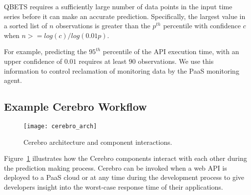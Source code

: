 
QBETS requires a sufficiently large number of data points
in the input time series before it can make an accurate prediction. 
Specifically, the largest value in a sorted list of $n$ observations is
greater than the $p^{th}$ percentile with confidence $c$ when $n >=
log(c)/log(0.01p)$.

For example, predicting the $95^{th}$ percentile
of the API execution time, with an upper confidence of $0.01$ requires at
least $90$ observations.
We use this information to control 
reclamation of monitoring data by the PaaS monitoring agent.

\subsection{Example Cerebro Workflow}

\begin{figure}
\centering
\texttt{[image: cerebro\_arch]}
\caption{Cerebro architecture and component interactions.}
\label{fig:cerebro_arch}
\end{figure}

Figure~\ref{fig:cerebro_arch} illustrates how the Cerebro components interact with
each other during the prediction making process.  Cerebro can be
invoked when a web API is deployed to a PaaS cloud or at any time during the development
process to give developers insight into the worst-case response time of their
applications.

